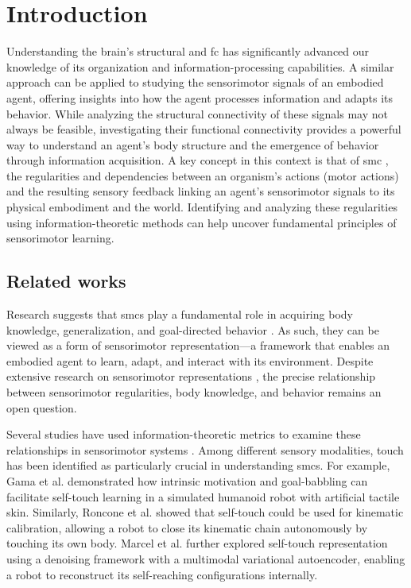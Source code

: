 \section{Introduction}\label{sec:intro}
Understanding the brain’s structural and \ac{fc} has significantly advanced our knowledge of its organization and information-processing capabilities. A similar approach can be applied to studying the sensorimotor signals of an embodied agent, offering insights into how the agent processes information and adapts its behavior. While analyzing the structural connectivity of these signals may not always be feasible, investigating their functional connectivity provides a powerful way to understand an agent’s body structure and the emergence of behavior through information acquisition. A key concept in this context is that of \ac{smc} \cite{Jacquey2019Sensorimotorcontingenciesas}, the regularities and dependencies between an organism's actions (motor actions) and the resulting sensory feedback linking an agent’s sensorimotor signals to its physical embodiment and the world. Identifying and analyzing these regularities using information-theoretic methods can help uncover fundamental principles of sensorimotor learning. 


\subsection{Related works}
Research suggests that \acp{smc} play a fundamental role in acquiring body knowledge, generalization, and goal-directed behavior \cite{Jacquey2019Sensorimotorcontingenciesas}. As such, they can be viewed as a form of sensorimotor representation---a framework that enables an embodied agent to learn, adapt, and interact with its environment. Despite extensive research on sensorimotor representations \cite{Nguyen2021Sensorimotorrepresentationlearning}, the precise relationship between sensorimotor regularities, body knowledge, and behavior remains an open question.

Several studies have used information-theoretic metrics to examine these relationships in sensorimotor systems \cite{Schmidt2013Bootstrappingperceptionusing,Lungarella2006Mappinginformationflow,Polani2009Modelsinformationprocessing,Bossomaier2016introductiontransferentropy,Olsson2006unknownsensorsactuators}. Among different sensory modalities, touch has been identified as particularly crucial in understanding \acp{smc}. For example, Gama et al. \cite{Gama2021Goaldirectedtactile} demonstrated how intrinsic motivation and goal-babbling can facilitate self-touch learning in a simulated humanoid robot with artificial tactile skin. Similarly, Roncone et al. \cite{Roncone2014Automatickinematicchain} showed that self-touch could be used for kinematic calibration, allowing a robot to close its kinematic chain autonomously by touching its own body. Marcel et al. \cite{Marcel2022Learningreachown} further explored self-touch representation using a denoising framework with a multimodal variational autoencoder, enabling a robot to reconstruct its self-reaching configurations internally.

